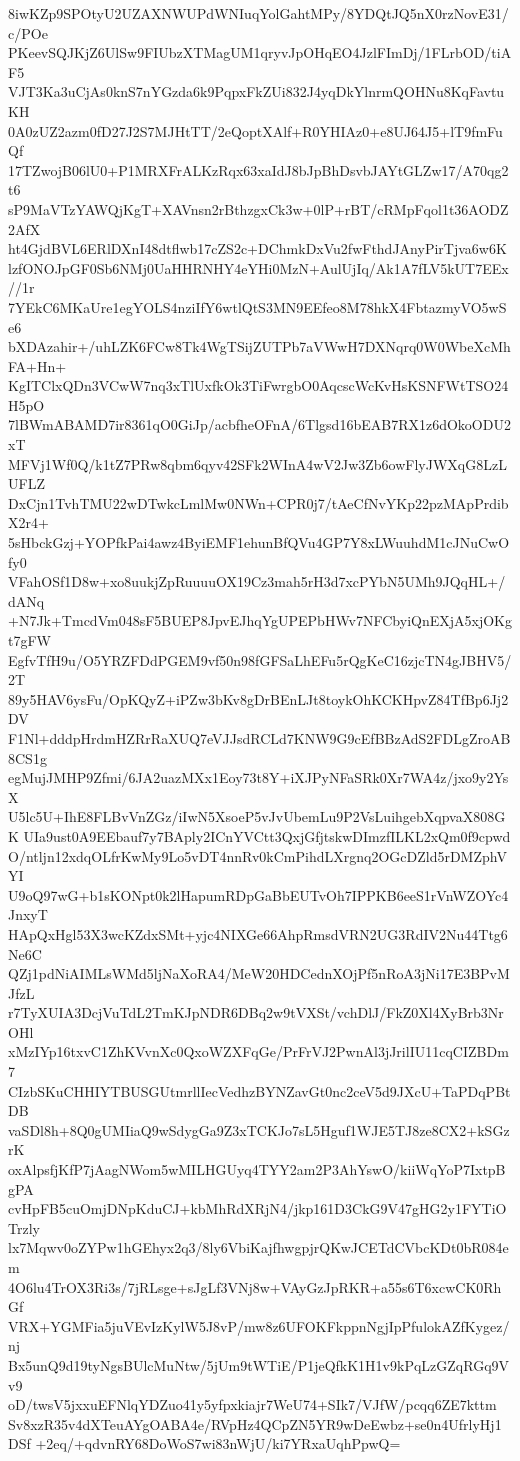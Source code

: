 8iwKZp9SPOtyU2UZAXNWUPdWNIuqYolGahtMPy/8YDQtJQ5nX0rzNovE31/c/POe
PKeevSQJKjZ6UlSw9FIUbzXTMagUM1qryvJpOHqEO4JzlFImDj/1FLrbOD/tiAF5
VJT3Ka3uCjAs0knS7nYGzda6k9PqpxFkZUi832J4yqDkYlnrmQOHNu8KqFavtuKH
0A0zUZ2azm0fD27J2S7MJHtTT/2eQoptXAlf+R0YHIAz0+e8UJ64J5+lT9fmFuQf
17TZwojB06lU0+P1MRXFrALKzRqx63xaIdJ8bJpBhDsvbJAYtGLZw17/A70qg2t6
sP9MaVTzYAWQjKgT+XAVnsn2rBthzgxCk3w+0lP+rBT/cRMpFqol1t36AODZ2AfX
ht4GjdBVL6ERlDXnI48dtflwb17cZS2c+DChmkDxVu2fwFthdJAnyPirTjva6w6K
lzfONOJpGF0Sb6NMj0UaHHRNHY4eYHi0MzN+AulUjIq/Ak1A7fLV5kUT7EEx//1r
7YEkC6MKaUre1egYOLS4nziIfY6wtlQtS3MN9EEfeo8M78hkX4FbtazmyVO5wSe6
bXDAzahir+/uhLZK6FCw8Tk4WgTSijZUTPb7aVWwH7DXNqrq0W0WbeXcMhFA+Hn+
KgITClxQDn3VCwW7nq3xTlUxfkOk3TiFwrgbO0AqcscWcKvHsKSNFWtTSO24H5pO
7lBWmABAMD7ir8361qO0GiJp/acbfheOFnA/6Tlgsd16bEAB7RX1z6dOkoODU2xT
MFVj1Wf0Q/k1tZ7PRw8qbm6qyv42SFk2WInA4wV2Jw3Zb6owFlyJWXqG8LzLUFLZ
DxCjn1TvhTMU22wDTwkcLmlMw0NWn+CPR0j7/tAeCfNvYKp22pzMApPrdibX2r4+
5sHbckGzj+YOPfkPai4awz4ByiEMF1ehunBfQVu4GP7Y8xLWuuhdM1cJNuCwOfy0
VFahOSf1D8w+xo8uukjZpRuuuuOX19Cz3mah5rH3d7xcPYbN5UMh9JQqHL+/dANq
+N7Jk+TmcdVm048sF5BUEP8JpvEJhqYgUPEPbHWv7NFCbyiQnEXjA5xjOKgt7gFW
EgfvTfH9u/O5YRZFDdPGEM9vf50n98fGFSaLhEFu5rQgKeC16zjcTN4gJBHV5/2T
89y5HAV6ysFu/OpKQyZ+iPZw3bKv8gDrBEnLJt8toykOhKCKHpvZ84TfBp6Jj2DV
F1Nl+dddpHrdmHZRrRaXUQ7eVJJsdRCLd7KNW9G9cEfBBzAdS2FDLgZroAB8CS1g
egMujJMHP9Zfmi/6JA2uazMXx1Eoy73t8Y+iXJPyNFaSRk0Xr7WA4z/jxo9y2YsX
U5lc5U+IhE8FLBvVnZGz/iIwN5XsoeP5vJvUbemLu9P2VsLuihgebXqpvaX808GK
UIa9ust0A9EEbauf7y7BAply2ICnYVCtt3QxjGfjtskwDImzfILKL2xQm0f9cpwd
O/ntljn12xdqOLfrKwMy9Lo5vDT4nnRv0kCmPihdLXrgnq2OGcDZld5rDMZphVYI
U9oQ97wG+b1sKONpt0k2lHapumRDpGaBbEUTvOh7IPPKB6eeS1rVnWZOYc4JnxyT
HApQxHgl53X3wcKZdxSMt+yjc4NIXGe66AhpRmsdVRN2UG3RdIV2Nu44Ttg6Ne6C
QZj1pdNiAIMLsWMd5ljNaXoRA4/MeW20HDCednXOjPf5nRoA3jNi17E3BPvMJfzL
r7TyXUIA3DcjVuTdL2TmKJpNDR6DBq2w9tVXSt/vchDlJ/FkZ0Xl4XyBrb3NrOHl
xMzIYp16txvC1ZhKVvnXc0QxoWZXFqGe/PrFrVJ2PwnAl3jJrilIU11cqCIZBDm7
CIzbSKuCHHIYTBUSGUtmrllIecVedhzBYNZavGt0nc2ceV5d9JXcU+TaPDqPBtDB
vaSDl8h+8Q0gUMIiaQ9wSdygGa9Z3xTCKJo7sL5Hguf1WJE5TJ8ze8CX2+kSGzrK
oxAlpsfjKfP7jAagNWom5wMILHGUyq4TYY2am2P3AhYswO/kiiWqYoP7IxtpBgPA
cvHpFB5cuOmjDNpKduCJ+kbMhRdXRjN4/jkp161D3CkG9V47gHG2y1FYTiOTrzly
lx7Mqwv0oZYPw1hGEhyx2q3/8ly6VbiKajfhwgpjrQKwJCETdCVbcKDt0bR084em
4O6lu4TrOX3Ri3s/7jRLsge+sJgLf3VNj8w+VAyGzJpRKR+a55s6T6xcwCK0RhGf
VRX+YGMFia5juVEvIzKylW5J8vP/mw8z6UFOKFkppnNgjIpPfulokAZfKygez/nj
Bx5unQ9d19tyNgsBUlcMuNtw/5jUm9tWTiE/P1jeQfkK1H1v9kPqLzGZqRGq9Vv9
oD/twsV5jxxuEFNlqYDZuo41y5yfpxkiajr7WeU74+SIk7/VJfW/pcqq6ZE7kttm
Sv8xzR35v4dXTeuAYgOABA4e/RVpHz4QCpZN5YR9wDeEwbz+se0n4UfrlyHj1DSf
+2eq/+qdvnRY68DoWoS7wi83nWjU/ki7YRxaUqhPpwQ=
